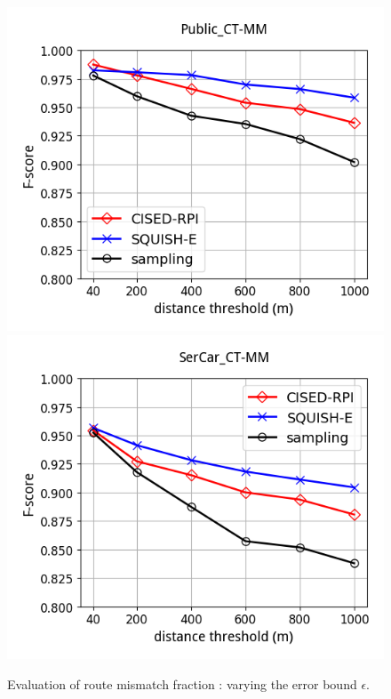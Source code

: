 \begin{figure}[tb!]
	\centering
  \includegraphics[height=0.3\textwidth]{Figures/Exp-epsilon-f-score-cmp_tc_CT-MM-Public.png}\hspace{5ex}
  \includegraphics[height=0.3\textwidth]{Figures/Exp-epsilon-f-score-cmp_tc_CT-MM-SerCar.png}\hspace{5ex}
	\vspace{-2.5ex}
  \caption{\small Evaluation of route mismatch fraction : varying the error bound $\epsilon$.}
	\label{fig:rmf-epsilon}
	\vspace{-2ex}
\end{figure}

